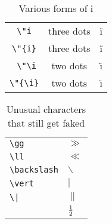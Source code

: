\documentclass{article}
\begin{document}
\begin{table}
\begin{center}
\begin{tabular}{ccc}
\verb# \"i # & three dots & \"i \\
\verb#\"{i}#  & three dots & \"{i} \\
\verb# \"\i#  & two dots &  \"\i \\
\verb#\"{\i}#  & two dots &  \"{\i} \\
\end{tabular}
\caption{Various forms of i}
\end{center}
\end{table}

\begin{table}
\begin{center}
\begin{tabular}{ll}
\verb#\gg# & $\gg$\\
\verb#\ll# & $\ll$\\
\verb#\backslash# & $\backslash$ \\
\verb#\vert# & $\vert$ \\
\verb#\|# & $\|$ \\
\verb#1\over2# & $1\over2$ 
\end{tabular}
\caption{Unusual characters that still get faked}
\end{center}
\end{table}
\end{document}
